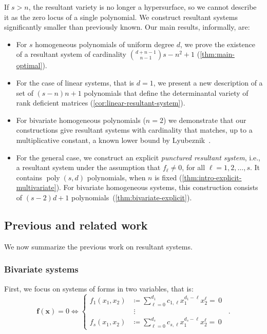 \documentclass[11pt,a4paper]{article}
\numberwithin{equation}{section}
\newcommand{\xx}{\ensuremath{\boldsymbol{x}}}
\newcommand{\ff}{\ensuremath{\boldsymbol{f}}}
\DeclareMathOperator{\poly}{poly}
\begin{document}
If $s>n$, the resultant variety is no longer a hypersurface, so we cannot  describe it as the zero locus of a single polynomial.
We construct resultant systems significantly smaller than previously known.
Our main results, informally, are:
\begin{itemize}
    \item For $s$ homogeneous polynomials of uniform degree $d$, we prove the existence of a resultant system of cardinality $\binom{d+n-1}{n-1}s-n^2+1$ (\cref{thm:main-optimal}).
    \item For the case of linear systems, that is $d=1$, we present a new description of a set of $(s-n)n+1$ polynomials that define the determinantal variety of rank deficient matrices (\cref{cor:linear-resultant-system}).
    \item For bivariate homogeneous polynomials ($n=2$) we demonstrate that our constructions give resultant systems with cardinality that matches, up to a multiplicative constant, a known  lower bound by Lyubeznik~\cite{Lyubeznik-95}.
    \item For the general case, we construct an explicit \emph{punctured resultant system}, i.e., a resultant system under the assumption that $f_\ell\neq 0$, for all $\ell=1,2,\dots,s$.
    It contains $\poly(s,d)$ polynomials, when $n$ is fixed (\cref{thm:intro-explicit-multivariate}).
    For bivariate homogeneous systems, this construction consists of $(s-2)d+1$ polynomials~(\cref{thm:bivariate-explicit}).
\end{itemize}




\subsection{Previous and related work}
\label{sec:prev-works}
We now summarize the previous work on resultant systems. 

\subsubsection{Bivariate systems}

First, we focus on systems of forms in two variables, that is:
\begin{equation}
	\label{eq:biv-system}
	\ff(\xx) = 0 \Leftrightarrow
\begin{cases}
    f_1(x_1, x_2) &\coloneqq \sum_{\ell=0}^{d_1} c_{1,\ell} x_1^{d_1-\ell}x_2^\ell =\,0 \\
    &\;\vdots  \\
    f_s(x_1, x_2) &\coloneqq \sum_{\ell=0}^{d_s} c_{s,\ell} x_1^{d_s-\ell}x_2^\ell =\,0
\end{cases} 
\enspace .
\end{equation}
\end{document}
